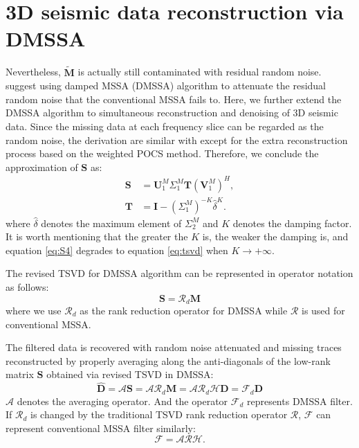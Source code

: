 \section{3D seismic data reconstruction via DMSSA}

Nevertheless, $\tilde{\mathbf{M}}$ is actually still contaminated  with residual random noise. \cite{weilin2016} suggest using damped MSSA (DMSSA) algorithm to attenuate the residual random noise that the conventional MSSA fails to. Here, we further extend the DMSSA algorithm to simultaneous reconstruction and denoising of 3D seismic data. Since the missing data at each frequency slice can be regarded as the random noise, the derivation are similar with \cite{weilin2016} except for the extra reconstruction process based on the weighted POCS method. Therefore, we conclude the approximation of $\mathbf{S}$ as:
\begin{align}
\label{eq:S4}
\mathbf{S} & = \mathbf{U}_1^M \Sigma_1^M\mathbf{T}(\mathbf{V}_1^M)^H,\\
\label{eq:T2}
\mathbf{T} & =\mathbf{I}-(\Sigma_1^M)^{-K}\hat{\delta}^K.
\end{align} 
where $\hat{\delta}$ denotes the maximum element of $\Sigma_2^M$ and $K$ denotes the damping factor. It is worth mentioning that the greater the $K$ is, the weaker the damping is, and equation \ref{eq:S4} degrades to equation \ref{eq:tsvd} when $K\rightarrow +\infty$.

The revised TSVD for DMSSA algorithm can be represented in operator notation as follows:
\begin{equation}
\label{eq:rankrdopt}
\mathbf{S}=\mathcal{R}_d\mathbf{M}
\end{equation}
where we use $\mathcal{R}_d$ as the rank reduction operator for DMSSA while $\mathcal{R}$ is used for conventional MSSA.

The filtered data is recovered with random noise attenuated and missing traces reconstructed by properly averaging along the anti-diagonals of the low-rank matrix $\mathbf{S}$ obtained via revised TSVD in DMSSA:\\ 
\begin{equation}
\label{eq:dmssaopt}
\hat{\mathbf{D}}=\mathcal{A}\mathbf{S}=\mathcal{A}\mathcal{R}_d\mathbf{M}=\mathcal{A}\mathcal{R}_d\mathcal{H}\mathbf{D}=\mathcal{F}_d\mathbf{D}
\end{equation}
$\mathcal{A}$ denotes the averaging operator. And the operator $\mathcal{F}_d$ represents DMSSA filter. If $\mathcal{R}_d$ is changed by the traditional TSVD rank reduction operator $\mathcal{R}$, $\mathcal{F}$ can represent conventional MSSA filter similarly:
\begin{equation}
\label{eq:F}
\mathcal{F}=\mathcal{A}\mathcal{R}\mathcal{H}.
\end{equation}

